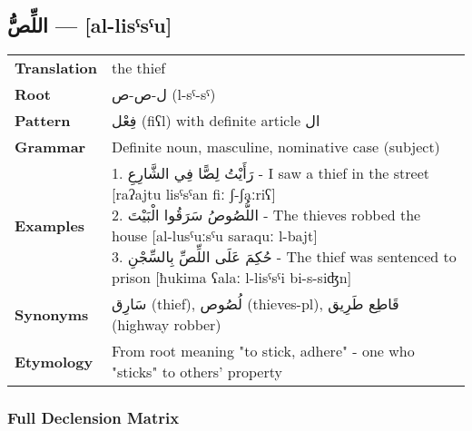 \documentclass[letterpaper,12pt]{article}
\begin{document}
\subsection{\textarabic{اللِّصُّ} — [al-lisˤsˤu]}

\begin{tabular}{p{3cm}p{10cm}}
\toprule
\textbf{Translation} & the thief \\
\textbf{Root} & \textarabic{ل-ص-ص} (l-sˤ-sˤ) \\
\textbf{Pattern} & \textarabic{فِعْل} (fiʕl) with definite article \textarabic{ال} \\
\textbf{Grammar} & Definite noun, masculine, nominative case (subject) \\
\textbf{Examples} & \makecell[l]{\parbox{9.5cm}{
1. \textarabic{رَأَيْتُ لِصًّا فِي الشَّارِعِ} - I saw a thief in the street [raʔajtu lisˤsˤan fiː ʃ-ʃaːriʕ]\\
2. \textarabic{اللُّصُوصُ سَرَقُوا الْبَيْتَ} - The thieves robbed the house [al-lusˤuːsˤu saraquː l-bajt]\\
3. \textarabic{حُكِمَ عَلَى اللِّصِّ بِالسِّجْنِ} - The thief was sentenced to prison [ħukima ʕalaː l-lisˤsˤi bi-s-siʤn]
}} \\
\midrule
\textbf{Synonyms} & \textarabic{سَارِق} (thief), \textarabic{لُصُوص} (thieves-pl), \textarabic{قَاطِع طَرِيق} (highway robber) \\
\textbf{Etymology} & From root meaning "to stick, adhere" - one who "sticks" to others' property \\
\bottomrule
\end{tabular}

\subsubsection*{Full Declension Matrix}
\end{document}
